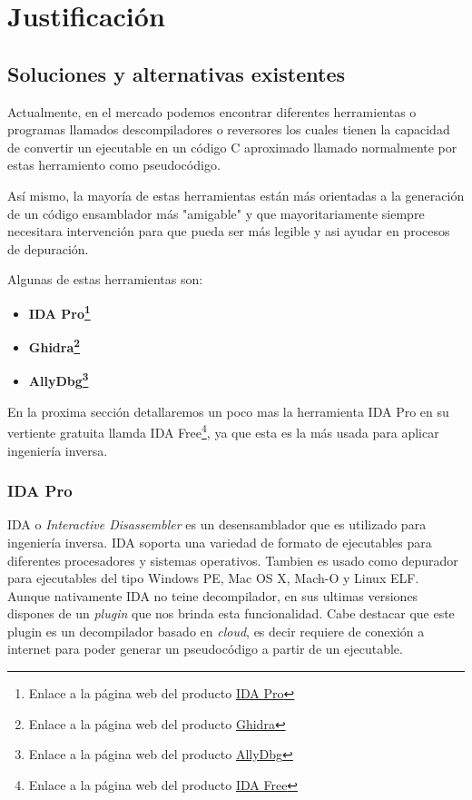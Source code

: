\chapter{Justificación}
\label{cap:justificacion}

\section{Soluciones y alternativas existentes}
\label{sec:alternativas}

Actualmente, en el mercado podemos encontrar diferentes herramientas o programas llamados descompiladores o reversores los cuales tienen la capacidad de convertir un ejecutable
en un código C aproximado llamado normalmente por estas herramiento como pseudocódigo.

Así mismo, la mayoría de estas herramientas están más orientadas a la generación de un código ensamblador más "amigable" y que mayoritariamente siempre necesitara intervención
para que pueda ser más legible y asi ayudar en procesos de depuración.

Algunas de estas herramientas son:

\begin{itemize}
    \item \bf IDA Pro\footnote{Enlace a la página web del producto \href{https://hex-rays.com/ida-pro/}{IDA Pro}}
    \item \bf Ghidra\footnote{Enlace a la página web del producto \href{https://ghidra-sre.org/}{Ghidra}}
    \item \bf AllyDbg\footnote{Enlace a la página web del producto \href{https://www.ollydbg.de/}{AllyDbg}}
\end{itemize}

En la proxima sección detallaremos un poco mas la herramienta IDA Pro en su vertiente gratuita llamda IDA Free\footnote{Enlace a la página web del producto \href{https://hex-rays.com/ida-free/}{IDA Free}},
ya que esta es la más usada para aplicar ingeniería inversa.

\subsection{IDA Pro}
\label{subsec:IDA_pro}

IDA o \textit{Interactive Disassembler} es un desensamblador que es utilizado para ingeniería inversa. IDA soporta una variedad de formato de ejecutables para diferentes procesadores y
sistemas operativos. Tambien es usado como depurador para ejecutables del tipo Windows PE, Mac OS X, Mach-O y Linux ELF\cite{IDAPro_Wikipedia}. Aunque nativamente IDA no teine decompilador, 
en sus ultimas versiones dispones de un \textit{plugin} que nos brinda esta funcionalidad. Cabe destacar que este plugin es un decompilador basado en \textit{cloud}, es decir requiere
de conexión a internet para poder generar un pseudocódigo a partir de un ejecutable.

